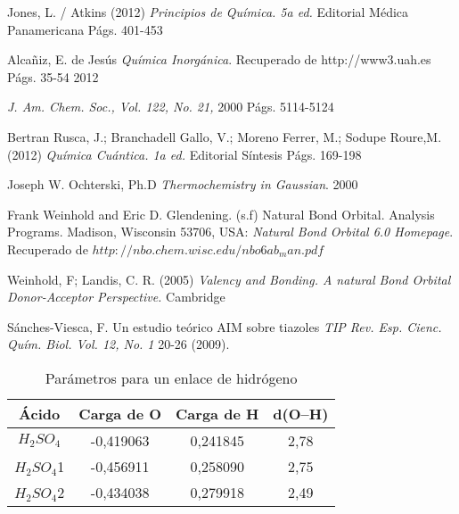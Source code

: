 \begin{thebibliography}{9}

Jones, L. / Atkins (2012)
\textit{Principios de Química. 5a ed.} Editorial Médica Panamericana
Págs. 401-453

Alcañiz, E. de Jesús
\textit{Química Inorgánica}. 
Recuperado de http://www3.uah.es Págs. 35-54
2012

\textit{J. Am. Chem. Soc., Vol. 122, No. 21, }
2000 Págs. 5114-5124

Bertran Rusca, J.; Branchadell Gallo, V.; Moreno Ferrer, M.; Sodupe Roure,M. (2012)
\textit{Química Cuántica. 1a ed.} Editorial Síntesis
Págs. 169-198

Joseph W. Ochterski, Ph.D
\textit{Thermochemistry in Gaussian}.
2000

Frank Weinhold and Eric D. Glendening. (s.f) Natural Bond Orbital. Analysis Programs. Madison, Wisconsin 53706, USA: 
\textit {Natural Bond Orbital 6.0 Homepage}. Recuperado de $http://nbo.chem.wisc.edu/nbo6ab_man.pdf$

Weinhold, F; Landis, C. R. (2005) 
\textit{Valency and Bonding. A natural Bond Orbital Donor-Acceptor Perspective.}
Cambridge

Sánches-Viesca, F. Un estudio teórico AIM sobre tiazoles \textit{TIP Rev. Esp. Cienc. Quím. Biol. Vol. 12, No. 1} 20-26 (2009).
\end{thebibliography}

\begin{table}[H]
	\centering
	\begin{tabular}{|c|c|c|c|}
		\hline
		Ácido & Carga de O & Carga de H & d(O--H) \\ \hline
		$H_2SO_4$ & -0,419063 & 0,241845 & 2,78 \\ \hline
		$H_2SO_4$1 & -0,456911 & 0,258090 & 2,75 \\ \hline
		$H_2SO_4$2 & -0,434038 & 0,279918 & 2,49 \\ \hline
	\end{tabular}
	\caption{Parámetros para un enlace de hidrógeno}
\end{table}